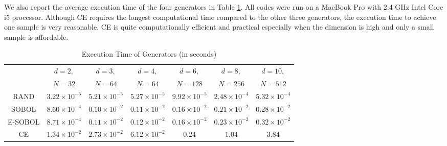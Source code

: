 \documentclass[graybox]{svmult}
\begin{document}
We also report the average execution time of the four generators in Table \ref{tab:ExeTime}. All codes were run on a MacBook Pro with 2.4 GHz Intel Core i5 processor. Although CE requires the longest computational time compared to the other three generators, the execution time to achieve one sample is very reasonable. CE is quite computationally efficient and practical especially when the dimension is high and only a small sample is affordable.

\begin{table}[htbp]
  \centering
  \caption{Execution Time of Generators (in seconds)}
    \begin{tabular}{ccccccc}
    \hline
          & $d=2,$   & $d=3,$   & $d=4,$   & $d=6,$   & $d=8,$   & $d=10,$ \\
  & $N=32$   & $N=64$   & $N=64$   & $N=128$   & $N=256$   & $N =512$ \\
    \hline
    RAND  & $3.22\times 10^{-5}$      &  $5.21\times 10^{-5}$     & $5.27\times 10^{-5}$      &  $9.92\times 10^{-5}$     & $2.48\times 10^{-4}$      & $ 5.32\times 10^{-4}$ \\
    SOBOL & $8.60\times 10^{-4}$      &  $0.10\times 10^{-2}$     &    $0.11\times 10^{-2}$   &  $0.16\times 10^{-2}$     & $0.21\times 10^{-2}$      &  $0.28\times 10^{-2}$\\
    E-SOBOL & $8.71\times 10^{-4}$  & $0.11\times 10^{-2}$      &     $0.12\times 10^{-2}$  &  $0.16\times 10^{-2}$     &   $0.23\times 10^{-2}$    & $0.32\times 10^{-2}$  \\
    CE    & $1.34\times 10^{-2}$      & $2.73\times 10^{-2}$      & $6.12\times 10^{-2}$      &   $0.24$    &   $1.04$    & $3.84$  \\
    \hline
    \end{tabular}%
  \label{tab:ExeTime}%
\end{table}%
\end{document}
